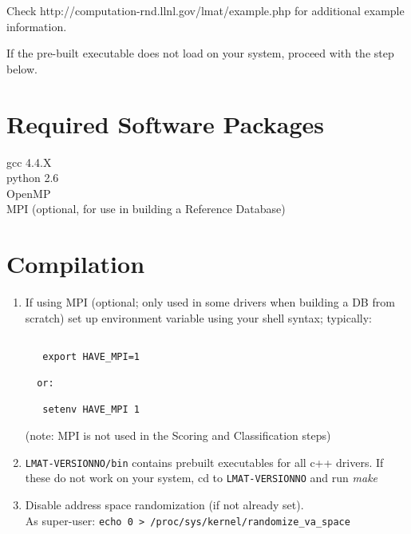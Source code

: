 \documentclass[11pt]{article}
\newcommand{\lmatver}{VERSIONNO}
\begin{document}
Check http://computation-rnd.llnl.gov/lmat/example.php for additional example information.

If the pre-built executable does not load on your system, proceed with the  step below.

\section{Required Software Packages}

gcc 4.4.X\\
python 2.6\\
OpenMP\\
MPI (optional, for use in building a Reference Database)

\section{Compilation}
\label{sec:compile}

\begin{enumerate}

%
%
%
%
%
%


\item

If using MPI (optional; only used in some drivers when building
    a DB from scratch) set up environment variable using your shell syntax; typically: 
\begin{verbatim}

   export HAVE_MPI=1

  or:

   setenv HAVE_MPI 1
\end{verbatim}

   (note: MPI is not used in the Scoring and Classification
    steps)


\item

         \texttt{LMAT-\lmatver/bin} contains prebuilt executables for all c++ drivers.
         If these do not work on your system,
         cd to \texttt{LMAT-\lmatver} and run {\em make}
\item
 Disable address space randomization (if not already set).\\
   As super-user: \texttt{echo 0 > /proc/sys/kernel/randomize\_va\_space}
\end{enumerate}
\end{document}
